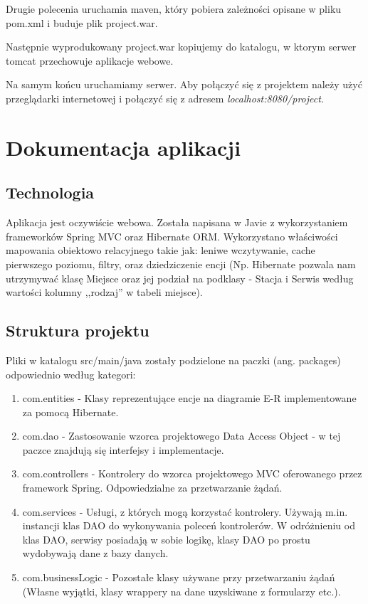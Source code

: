 \documentclass{article}
\begin{document}
Drugie polecenia uruchamia maven, który pobiera zależności opisane w pliku pom.xml i buduje plik project.war.

Następnie wyprodukowany project.war kopiujemy do katalogu, w ktorym serwer tomcat przechowuje aplikacje webowe.

Na samym końcu uruchamiamy serwer. Aby połączyć się z projektem należy użyć przeglądarki
internetowej i połączyć się z adresem \emph{localhost:8080/project}.

\section{Dokumentacja aplikacji}
\subsection{Technologia}
Aplikacja jest oczywiście webowa. Została napisana w Javie z wykorzystaniem frameworków Spring MVC oraz
Hibernate ORM. Wykorzystano właściwości mapowania obiektowo relacyjnego takie jak: leniwe wczytywanie, cache pierwszego poziomu,
filtry, oraz dziedziczenie encji (Np. Hibernate pozwala nam utrzymywać klasę Miejsce
oraz jej podział na podklasy - Stacja i Serwis według wartości kolumny ,,rodzaj'' w tabeli miejsce).

\subsection{Struktura projektu}
Pliki w katalogu src/main/java zostały podzielone na paczki (ang. packages) odpowiednio według kategori:
\begin{enumerate}
	\item com.entities - Klasy reprezentujące encje na diagramie E-R implementowane za pomocą Hibernate.
	\item com.dao - Zastosowanie wzorca projektowego Data Access Object - w tej paczce znajdują się interfejsy i implementacje.
	\item com.controllers - Kontrolery do wzorca projektowego MVC oferowanego przez framework Spring. Odpowiedzialne za przetwarzanie żądań.
	\item com.services - Usługi, z których mogą korzystać kontrolery. Używają m.in. instancji klas DAO do wykonywania poleceń kontrolerów.
		W odróżnieniu od klas DAO, serwisy posiadają w sobie logikę, klasy DAO po prostu wydobywają dane z bazy danych.
	\item com.businessLogic - Pozostałe klasy używane przy przetwarzaniu żądań (Własne wyjątki, klasy wrappery na dane uzyskiwane z formularzy etc.).
\end{enumerate}
\end{document}

